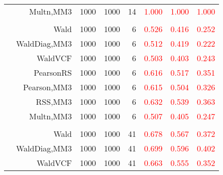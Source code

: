 \documentclass[
]{article}
\begin{document}
\begin{table}[H]
{\begin{tabular}[t]{lrrrrrrr}
\hspace{1em} & Multn,MM3 & 1000 & 1000 & 14 & \textcolor{red}{1.000} & \textcolor{red}{1.000} & \textcolor{red}{1.000}\\
\cmidrule{1-8}
\addlinespace[0.3em]
\multicolumn{8}{l}{\textbf{2F 10V}}\\
\hspace{1em} & Wald & 1000 & 1000 & 6 & \textcolor{red}{0.526} & \textcolor{red}{0.416} & \textcolor{red}{0.252}\\

\hspace{1em} & WaldDiag,MM3 & 1000 & 1000 & 6 & \textcolor{red}{0.512} & \textcolor{red}{0.419} & \textcolor{red}{0.222}\\

\hspace{1em} & WaldVCF & 1000 & 1000 & 6 & \textcolor{red}{0.503} & \textcolor{red}{0.403} & \textcolor{red}{0.243}\\

\hspace{1em} & PearsonRS & 1000 & 1000 & 6 & \textcolor{red}{0.616} & \textcolor{red}{0.517} & \textcolor{red}{0.351}\\

\hspace{1em} & Pearson,MM3 & 1000 & 1000 & 6 & \textcolor{red}{0.615} & \textcolor{red}{0.504} & \textcolor{red}{0.326}\\

\hspace{1em} & RSS,MM3 & 1000 & 1000 & 6 & \textcolor{red}{0.632} & \textcolor{red}{0.539} & \textcolor{red}{0.363}\\

\hspace{1em} & Multn,MM3 & 1000 & 1000 & 6 & \textcolor{red}{0.507} & \textcolor{red}{0.405} & \textcolor{red}{0.247}\\
\cmidrule{1-8}
\addlinespace[0.3em]
\multicolumn{8}{l}{\textbf{3F 15V}}\\
\hspace{1em} & Wald & 1000 & 1000 & 41 & \textcolor{red}{0.678} & \textcolor{red}{0.567} & \textcolor{red}{0.372}\\

\hspace{1em} & WaldDiag,MM3 & 1000 & 1000 & 41 & \textcolor{red}{0.699} & \textcolor{red}{0.596} & \textcolor{red}{0.402}\\

\hspace{1em} & WaldVCF & 1000 & 1000 & 41 & \textcolor{red}{0.663} & \textcolor{red}{0.555} & \textcolor{red}{0.352}\\


\end{tabular}}
\end{table}
\end{document}
